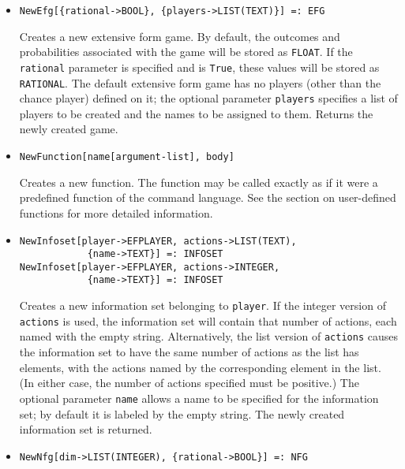 \begin{itemize}
\item
\protect \large \begin{verbatim} 
NewEfg[{rational->BOOL}, {players->LIST(TEXT)}] =: EFG
\end{verbatim}\normalsize

\bd
Creates a new extensive form game.  By default, the
outcomes and probabilities associated with the game will be stored as
{\tt FLOAT}.  If the \verb+rational+ parameter is specified and is \verb+True+,
these values will be stored as {\tt RATIONAL}.  The default extensive form
game has no players (other than the chance player) defined on it; the
optional parameter \verb+players+ specifies a list of players to be
created and the names to be assigned to them.  Returns the newly created
game.
\ed

\item   
\protect \large \begin{verbatim}
NewFunction[name[argument-list], body]
\end{verbatim}\normalsize

\bd
Creates a new function.  The function may be called exactly
as if it were a predefined function of the command language.  See the
section on user-defined functions for more detailed information.
\ed

\item
\protect \large \begin{verbatim} 
NewInfoset[player->EFPLAYER, actions->LIST(TEXT),
            {name->TEXT}] =: INFOSET
NewInfoset[player->EFPLAYER, actions->INTEGER,
            {name->TEXT}] =: INFOSET
\end{verbatim}\normalsize

\bd
Creates a new information set belonging to \verb+player+.
If the integer version of \verb+actions+ is used, the information set
will contain that number of actions, each named with the empty string.
Alternatively, the list version of \verb+actions+ causes the information
set to have the same number of actions as the list has elements, with
the actions named by the corresponding element in the list.  (In either
case, the number of actions specified must be positive.)  The optional
parameter \verb+name+ allows a name to be specified for the information
set; by default it is labeled by the empty string.  The newly created
information set is returned.
\ed

\item
\protect \large \begin{verbatim}
NewNfg[dim->LIST(INTEGER), {rational->BOOL}] =: NFG
\end{verbatim}\normalsize


\end{itemize}
